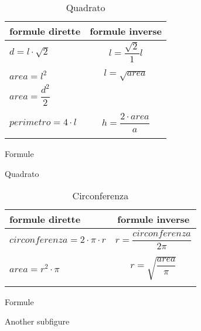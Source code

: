 \begin{table}[H]
	\begin{subtable}[b]{.5\linewidth}
		\centering
		\begin{tabular}{lc}
			\toprule
			formule dirette& formule inverse\\
			\midrule	
			$d=l\cdot\sqrt{2}$& $l=\dfrac{\sqrt{2}}{1}l$\\
			&\\
			$area=l^2$&$l=\sqrt{area}$\\
			$area=\dfrac{d^2}{2}$&\\
			&\\
			$perimetro=4\cdot l$&$h=\dfrac{2\cdot area}{a}$\\
			&\\
			\bottomrule	
		\end{tabular}
		\caption{Formule}
	\end{subtable}%
	\begin{subtable}[b]{.5\linewidth}
		\centering
		\caption{Quadrato}
	\end{subtable}
\caption{Quadrato}
\label{fig:quadrato}
\end{table}

%

\begin{table}
	\begin{subtable}[b]{.5\linewidth}
		\centering
		\begin{tabular}{lc}
			\toprule
			formule dirette& formule inverse\\
			\midrule	
			$circonferenza=2\cdot\pi\cdot r$& $r=\dfrac{circonferenza}{2\pi}$\\
			&\\
			$area=r^2\cdot\pi$&$r=\sqrt{\dfrac{area}{\pi}}$\\
			&\\
			\bottomrule	
		\end{tabular}
		\caption{Formule}\label{fig:1a}
	\end{subtable}%
	\begin{subtable}[b]{.5\linewidth}
		\centering
		\caption{Another subfigure}
	\end{subtable}
	\caption{Circonferenza}
	\label{fig:circonferenza}
\end{table}


